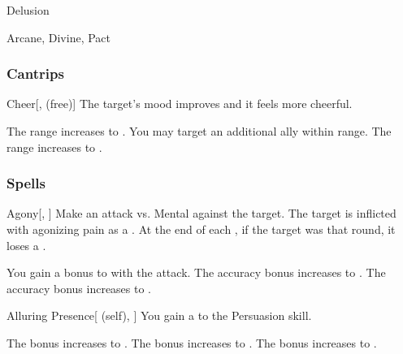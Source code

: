 \newpage
\begin{spellsection}{Delusion}

\begin{spellheader}
\end{spellheader}


 Arcane, Divine, Pact

\subsubsection{Cantrips}


\begin{freeability}{Cheer}[,  (free)]
The target's mood improves and it feels more cheerful.

\rankline
{} The range increases to \rngmed.
 You may target an additional ally within range.
 The range increases to \rnglong.
\end{freeability}

\end{spellsection}


\subsubsection{Spells}


\lowercase{\hypertarget{spell:Agony}{}}\label{spell:Agony}
\begin{freeability}[Rank 1]{\hypertarget{spell:Agony}{Agony}}[, ]
Make an attack vs. Mental against the target.
\hit The target is inflicted with agonizing pain as a .
At the end of each , if the target was  that round, it loses a .

\rankline
{} You gain a  bonus to  with the attack.
 The accuracy bonus increases to .
 The accuracy bonus increases to .
\end{freeability}
\vspace{0.25em}



\lowercase{\hypertarget{spell:Alluring Presence}{}}\label{spell:Alluring Presence}
\begin{attuneability}[Rank 1]{\hypertarget{spell:Alluring Presence}{Alluring Presence}}[ (self), ]
You gain a   to the Persuasion skill.

\rankline
{} The bonus increases to .
 The bonus increases to .
 The bonus increases to .
\end{attuneability}
\vspace{0.25em}




